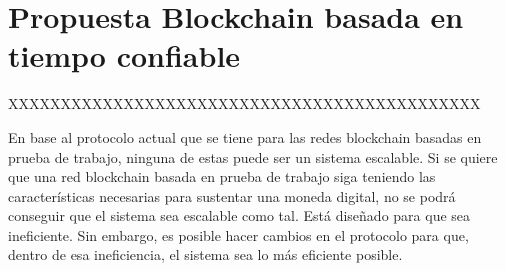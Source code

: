 \chapter{Propuesta Blockchain basada en tiempo confiable}

XXXXXXXXXXXXXXXXXXXXXXXXXXXXXXXXXXXXXXXXXXXXX\newline

En base al protocolo actual que se tiene para las redes blockchain basadas en prueba de trabajo, ninguna de estas puede ser un sistema escalable. Si se quiere que una red blockchain basada en prueba de trabajo siga teniendo las características necesarias para sustentar una moneda digital, no se podrá conseguir que el sistema sea escalable como tal. Está diseñado para que sea ineficiente. Sin embargo, es posible hacer cambios en el protocolo para que, dentro de esa ineficiencia, el sistema sea lo más eficiente posible. \newline

